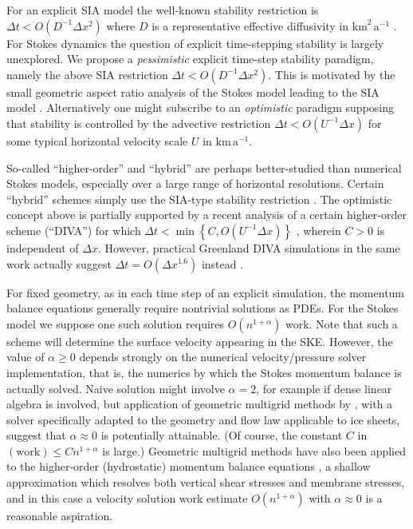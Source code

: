 \documentclass[twocolumn,letterpaper]{igs}
\begin{document}
For an explicit SIA model the well-known stability restriction is $\Delta t < O(D^{-1} \Delta x^2)$ where $D$ is a representative effective diffusivity in $\text{km}^2\,\text{a}^{-1}$ \citep{Bueleretal2005,HindmarshPayne1996}.
For Stokes dynamics the question of explicit time-stepping stability is largely unexplored.  We propose a \emph{pessimistic} explicit time-step stability paradigm, namely the above SIA restriction $\Delta t < O(D^{-1} \Delta x^2)$.  This is motivated by the small geometric aspect ratio analysis of the Stokes model leading to the SIA model \citep{GreveBlatter2009}.  Alternatively one might subscribe to an \emph{optimistic} paradigm supposing that stability is controlled by the advective restriction $\Delta t < O(U^{-1} \Delta x)$ for some typical horizontal velocity scale $U$ in $\text{km}\,\text{a}^{-1}$.

So-called ``higher-order'' and ``hybrid'' are perhaps better-studied than numerical Stokes models, especially over a large range of horizontal resolutions.  Certain ``hybrid'' schemes simply use the SIA-type stability restriction \citep{Winkelmannetal2011}.  The optimistic concept above is partially supported by a recent analysis of a certain higher-order scheme (``DIVA'') for which $\Delta t < \min\left\{C,O(U^{-1} \Delta x)\right\}$ \citep[equations (52) and (56)]{Robinsonetal2022}, wherein $C>0$ is independent of $\Delta x$.  However, practical Greenland DIVA simulations in the same work actually suggest $\Delta t = O(\Delta x^{1.6})$ instead \citep[Figure 3(a)]{Robinsonetal2022}.

For fixed geometry, as in each time step of an explicit simulation, the momentum balance equations generally require nontrivial solutions as PDEs.  For the Stokes model we suppose one such solution requires $O(n^{1+\alpha})$ work.  Note that such a scheme will determine the surface velocity appearing in the SKE.  However, the value of $\alpha \ge 0$ depends strongly on the numerical velocity/pressure solver implementation, that is, the numerics by which the Stokes momentum balance is actually solved.  Naive solution might involve $\alpha=2$, for example if dense linear algebra is involved, but application of geometric multigrid methods by \cite{IsaacStadlerGhattas2015}, with a solver specifically adapted to the geometry and flow law applicable to ice sheets, suggest that $\alpha \approx 0$ is potentially attainable.  (Of course, the constant $C$ in $(\text{work}) \le C n^{1+\alpha}$ is large.)  Geometric multigrid methods have also been applied to the higher-order (hydrostatic) momentum balance equations \citep{BrownSmithAhmadia2013}, a shallow approximation which resolves both vertical shear stresses and membrane stresses, and in this case a velocity solution work estimate $O(n^{1+\alpha})$ with $\alpha \approx 0$ is a reasonable aspiration.
\end{document}
